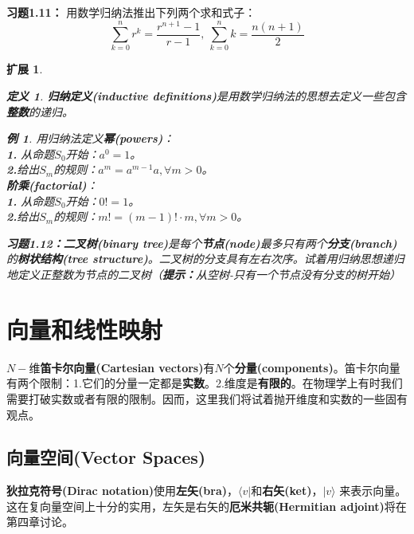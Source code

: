 \documentclass[mathserif,hyperref,UTF8,openany,b5paper]{ctexbook}
\newtheorem{exmp}{例}[section]
\newtheorem{defn}{定义}[section]
\newtheorem{kuo}{扩展}[section]
\begin{document}
\textbf{习题1.11：} 用数学归纳法推出下列两个求和式子：
\begin{equation}
\sum^n_{k=0}r^k=\frac{r^{n+1}-1}{r-1}, \ \sum^n_{k=0}k=\frac{n(n+1)}{2}
\end{equation} 

\begin{kuo}
\begin{defn}
\textbf{归纳定义(inductive definitions)}是用数学归纳法的思想去定义一些包含\textbf{整数}的递归。
\end{defn}
\begin{exmp}
用归纳法定义\textbf{幂(powers)}：\\
\textbf{1. }从命题$S_0$开始：$a^0=1$。\\
\textbf{2.}给出$S_m$的规则：$a^m=a^{m-1}a,\forall m>0$。\\
\textbf{阶乘(factorial)}：\\
\textbf{1. }从命题$S_0$开始：$0!=1$。\\
\textbf{2.}给出$S_m$的规则：$m!=(m-1)! \cdot m,\forall m>0$。\\
\end{exmp}
\textbf{习题1.12：}\textbf{二叉树(binary tree)}是每个\textbf{节点(node)}最多只有两个\textbf{分支(branch)}的\textbf{树状结构(tree structure)}。二叉树的分支具有左右次序。试着用归纳思想递归地定义正整数为节点的二叉树（\textbf{提示：}从空树-只有一个节点没有分支的树开始）
\end{kuo}

\chapter{向量和线性映射}
\thispagestyle{fancy}
$N-$维\textbf{笛卡尔向量(Cartesian vectors)}有$N$个\textbf{分量(components)}。笛卡尔向量有两个限制：1.它们的分量一定都是\textbf{实数}。2.维度是\textbf{有限的}。在物理学上有时我们需要打破实数或者有限的限制。因而，这里我们将试着抛开维度和实数的一些固有观点。
\section{向量空间(Vector Spaces)}
\textbf{狄拉克符号(Dirac notation)}使用\textbf{左矢(bra)}，$\langle v|$和\textbf{右矢(ket)}，$|v\rangle$ 来表示向量。这在复向量空间上十分的实用，左矢是右矢的\textbf{厄米共轭(Hermitian adjoint)}将在第四章讨论。
\end{document}
